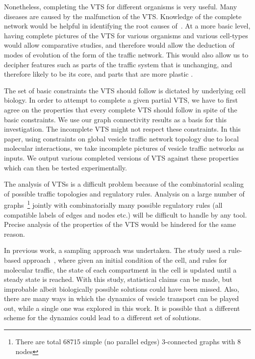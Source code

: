 Nonetheless, completing the VTS for different organisms is very useful. 
%
Many diseases are caused by the malfunction of the VTS. 
%
Knowledge of the complete network would be helpful in identifying the root causes of~\cite{bexiga2013human,gissen2007cargos}. 
%
At a more basic level, having complete pictures of the VTS for various organisms and various cell-types would allow comparative studies, and therefore would allow the deduction of modes of evolution of the form of the traffic network. 
%
This would also allow us to decipher features such as parts of the traffic system that is unchanging, and therefore likely to be its core, and parts that are more plastic \cite{barlow2017seeing}.

%
The set of basic constraints the VTS should follow is dictated by underlying cell biology.   
%
In order to attempt to complete a given partial VTS, we have to first agree on the properties that every complete VTS should follow in spite of the basic constraints. 
%
We use our graph connectivity results as a basis for this investigation.   
%
The incomplete VTS might not respect these constraints. 
%
In this paper, using constraints on global vesicle traffic network topology due to local molecular interactions, we take incomplete pictures of vesicle traffic networks as inputs.
%
We output various completed versions of VTS against these properties which can then be tested experimentally.
%

The analysis of VTSs is a difficult problem because
of the combinatorial scaling of possible traffic topologies and
regulatory rules.
%
Analysis on a large number of graphs~\footnote{There are total 68715 simple (no parallel edges) 3-connected graphs with 8 nodes} jointly with combinatorially many possible regulatory rules (all compatible labels of edges and nodes etc.) will be difficult to handle by any tool.
%
Precise analysis of the properties of the VTS would be hindered for the same reason. 

In previous work, a sampling approach was undertaken. 
%
The study used a rule-based approach~\cite{mani2016stacking}, where given an initial condition of the cell, and rules for molecular traffic, the state of each compartment in the cell is updated until a steady state is reached. 
%
With this study, statistical claims can be made, but improbable albeit biologically possible solutions could have been missed.
%
Also, there are many ways in which the dynamics of vesicle transport can be played out, while a single one was explored in this work. 
%
It is possible that a different scheme for the dynamics could lead to a different set of solutions.

